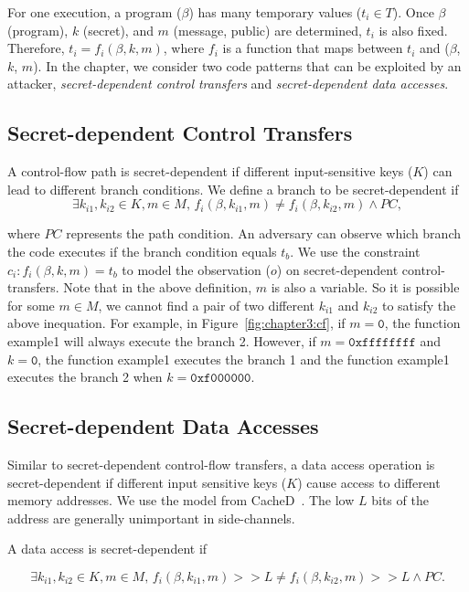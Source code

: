 For one execution, a program ($\beta$) has many temporary values ($t_i \in
  T$). Once $\beta$ (program), $k$ (secret), and $m$ (message, public) are
determined, $t_i$ is also fixed. Therefore, $ t_i = f_i(\beta, k, m)$, where $f_
  i$ is a function that maps between $t_i$ and ($\beta$, $k$, $m$). In the chapter,
we consider two code patterns that can be exploited by an attacker,
\emph{secret-dependent control transfers} and \emph{secret-dependent data
  accesses}. 

\subsection{Secret-dependent Control Transfers}
A control-flow path is secret-dependent if different input-sensitive keys
($K$) can lead to different branch conditions.
We define a branch to be secret-dependent if
$$\exists k_{i1}, k_{i2} \in K, m \in M, \,f_i(\beta, k_{i1}, m) \neq f_i(\beta, k_{i2}, m) \land PC,$$

\noindent where $PC$ represents the path condition. An adversary can observe which branch the code executes if the branch condition
equals $t_b$. We use the constraint $c_i : f_i(\beta, k, m) = t_b$ to model
the observation ($o$) on secret-dependent control-transfers. Note that in the
above definition, $m$ is also a variable. So it is possible for some $m \in M$,
we cannot find a pair of two different $k_{i1}$ and $k_{i2}$ to satisfy the above inequation. For example, in Figure~\ref{fig:chapter3:cf}, if $m = \mathtt{0}$, the function \textsf{example1} will always execute the branch 2. However, if $m = \mathtt{0xffffffff}$ and $k = \mathtt{0}$, the function \textsf{example1} executes the branch 1 and the function \textsf{example1} executes the branch 2 when $k = \mathtt{0xf000000}$.


\subsection{Secret-dependent Data Accesses}
Similar to secret-dependent control-flow transfers, a data access operation is
secret-dependent if different input sensitive keys ($K$) cause access to different memory addresses. We use the model from CacheD~\cite{203878}. The low $L$ bits of the address are generally unimportant in side-channels.

A data access is secret-dependent if

$$\exists k_{i1}, k_{i2} \in K, m \in M,\,f_i(\beta, k_{i1}, m) >> L \neq f_i(\beta, k_{i2}, m) >> L \land PC.$$

